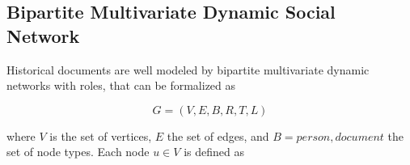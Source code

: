 



\subsection{Bipartite Multivariate Dynamic Social Network}\label{subsec:hsna-bipartite-model}

Historical documents are well modeled by bipartite multivariate dynamic networks with roles, that can be formalized as

\begin{equation}
    G = (V, E, B, R, T, L)
\end{equation}

where $V$ is the set of vertices, $E$ the set of edges, and $B = {person, document}$ the set of node types.
Each node $u \in V$ is defined as


